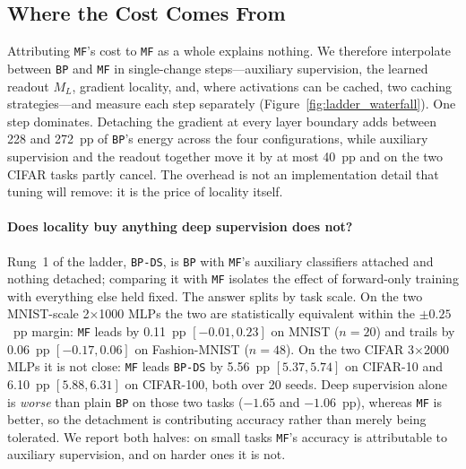 \documentclass{llncs}
\newcommand{\MF}{\texttt{MF}}
\newcommand{\BP}{\texttt{BP}}
\begin{document}
\subsection{Where the Cost Comes From}
\label{sec:ladder}

Attributing \MF{}'s cost to \MF{} as a whole explains nothing. We therefore
interpolate between \BP{} and \MF{} in single-change steps---auxiliary
supervision, the learned readout $M_L$, gradient locality, and, where
activations can be cached, two caching strategies---and measure each step
separately (Figure~\ref{fig:ladder_waterfall}). One step dominates. Detaching
the gradient at every layer boundary adds between \num{228} and \num{272}~pp of
\BP{}'s energy across the four configurations, while auxiliary supervision and
the readout together move it by at most \num{40}~pp and on the two CIFAR tasks
partly cancel. The overhead is not an implementation detail that tuning will
remove: it is the price of locality itself.

\paragraph{Does locality buy anything deep supervision does not?}
Rung~1 of the ladder, \texttt{BP-DS}, is \BP{} with \MF{}'s auxiliary
classifiers attached and nothing detached; comparing it with \MF{} isolates
the effect of forward-only training with everything else held fixed. The
answer splits by task scale. On the two MNIST-scale 2$\times$1000 MLPs the two
are statistically equivalent within the $\pm\num{0.25}$~pp margin: \MF{}
leads by \num{0.11}~pp $[\num{-0.01},\num{+0.23}]$ on MNIST ($n=20$) and
trails by \num{0.06}~pp $[\num{-0.17},\num{+0.06}]$ on Fashion-MNIST ($n=48$).
On the two CIFAR 3$\times$2000 MLPs it is not close: \MF{} leads
\texttt{BP-DS} by \num{5.56}~pp $[\num{+5.37},\num{+5.74}]$ on CIFAR-10 and
\num{6.10}~pp $[\num{+5.88},\num{+6.31}]$ on CIFAR-100, both over \num{20}
seeds. Deep supervision alone is \emph{worse} than plain \BP{} on those two
tasks ($-\num{1.65}$ and $-\num{1.06}$~pp), whereas \MF{} is better, so the
detachment is contributing accuracy rather than merely being tolerated. We
report both halves: on small tasks \MF{}'s accuracy is attributable to
auxiliary supervision, and on harder ones it is not.
\end{document}
